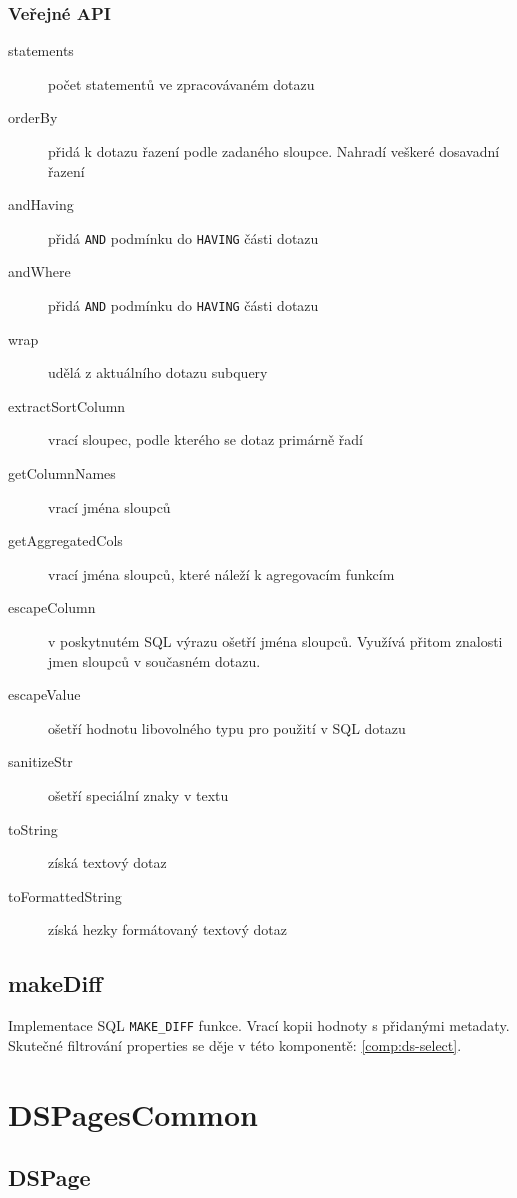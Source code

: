 \subsubsection*{Veřejné API}

\begin{description}
  \item[statements] počet statementů ve zpracovávaném dotazu
  \item[orderBy] přidá k dotazu řazení podle zadaného sloupce. Nahradí veškeré dosavadní řazení
  \item[andHaving] přidá \lstinline|AND| podmínku do \lstinline|HAVING| části dotazu
  \item[andWhere] přidá \lstinline|AND| podmínku do \lstinline|HAVING| části dotazu
  \item[wrap] udělá z aktuálního dotazu subquery
  \item[extractSortColumn] vrací sloupec, podle kterého se dotaz primárně řadí
  \item[getColumnNames] vrací jména sloupců
  \item[getAggregatedCols] vrací jména sloupců, které náleží k agregovacím funkcím
  \item[escapeColumn] v poskytnutém SQL výrazu ošetří jména sloupců. Využívá přitom znalosti jmen sloupců v současném dotazu.
  \item[escapeValue] ošetří hodnotu libovolného typu pro použití v SQL dotazu
  \item[sanitizeStr] ošetří speciální znaky v textu
  \item[toString] získá textový dotaz
  \item[toFormattedString] získá hezky formátovaný textový dotaz
\end{description}

\subsection{makeDiff}
\label{fn:makeDiff}

Implementace SQL \lstinline|MAKE_DIFF| funkce. Vrací kopii hodnoty s přidanými metadaty. Skutečné filtrování properties se děje v této komponentě: \ref{comp:ds-select}.

\section{DSPagesCommon}

\subsection{DSPage}

